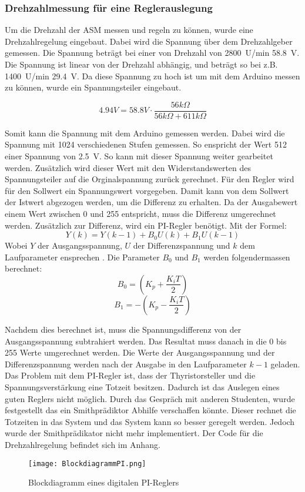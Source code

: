 \subsubsection{Drehzahlmessung für eine Reglerauslegung}
Um die Drehzahl der ASM messen und regeln zu können, wurde eine Drehzahlregelung eingebaut. Dabei wird die Spannung über dem Drehzahlgeber gemessen. Die Spannung beträgt bei einer von Drehzahl von \SI{2800}{U/min} \SI{58.8}{V}. Die Spannung ist linear von der Drehzahl abhängig, und beträgt so bei z.B. \SI{1400}{U/min} \SI{29.4}{V}. Da diese Spannung zu hoch ist um mit dem Arduino messen zu können, wurde ein Spannungsteiler eingebaut. 

\begin{equation}
4.94 V = 58.8 V \cdot \frac{56k\Omega}{56k\Omega + 611k\Omega}
\end{equation}

Somit kann die Spannung mit dem Arduino gemessen werden. Dabei wird die Spannung mit 1024 verschiedenen Stufen gemessen. So enspricht der Wert 512 einer Spannung von \SI{2.5}{V}.
 So kann mit dieser Spannung weiter gearbeitet werden. Zusätzlich wird dieser Wert mit den Widerstandswerten des Spannungsteiler auf die Orginalspannung zurück gerechnet. Für den Regler wird für den Sollwert ein Spannungswert vorgegeben. Damit kann von dem Sollwert der Istwert abgezogen werden, um die Differenz zu erhalten. Da der Ausgabewert einem Wert zwischen 0 und 255 entspricht, muss die Differenz umgerechnet werden. Zusätzlich zur Differenz, wird ein PI-Regler benötigt. 
Mit der Formel: \cite{Quelle_Marco} 
\begin{equation}
Y(k) = Y(k-1)+ B_0U(k)+B_1U(k-1)
\end{equation}
Wobei $Y$ der Ausgangsspannung, $U$ der Differenzspannung und $k$ dem Laufparameter ensprechen \cite{PI_Regler}. Die Parameter $B_0$ und $B_1$ werden folgendermassen berechnet:
\begin{equation}\label{eq:B0}
B_0 = \left(K_p + \frac{K_iT}{2}\right) 
\end{equation}
\begin{equation}\label{eq:B1}
B_1 = -\left(K_p - \frac{K_iT}{2}\right) 
\end{equation}

Nachdem dies berechnet ist, muss die Spannungsdifferenz von der Ausgangsspannung subtrahiert werden. Das Resultat muss danach in die 0 bis 255 Werte umgerechnet werden. Die Werte der Ausgangsspannung und der Differenzspannung werden nach der Ausgabe in den Laufparameter $k-1$ geladen. Das Problem mit dem PI-Regler ist, dass der Thyristorsteller und die Spannungsverstärkung eine Totzeit besitzen. Dadurch ist das Auslegen eines guten Reglers nicht möglich. Durch das Gespräch mit anderen Studenten, wurde festgestellt das ein Smithprädiktor \cite{Regelungstechnik_Buch} Abhilfe verschaffen könnte. Dieser rechnet die Totzeiten in das System und das System kann so besser geregelt werden. Jedoch wurde der Smithprädikator nicht mehr implementiert. Der Code für die Drehzahlregelung befindet sich im Anhang. 

\begin{figure}[ht!]
	\centering
	\texttt{[image: BlockdiagrammPI.png]}	
	\caption{Blockdiagramm eines digitalen PI-Reglers}\label{fig:PIRegler}
\end{figure}






